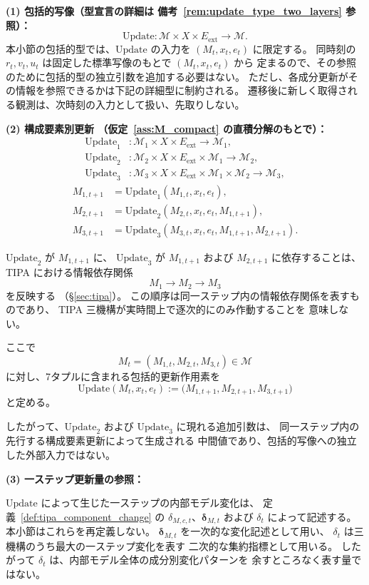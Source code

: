 \begin{definition}[Update作用素の構造]
\label{def:update_operator}

\textbf{(1) 包括的写像（型宣言の詳細は
備考~\ref{rem:update_type_two_layers} 参照）：}
\[
  \mathrm{Update} :
  \mathcal{M}\times X\times E_{\mathrm{ext}}
  \longrightarrow
  \mathcal{M}.
\]
本小節の包括的型では、$\mathrm{Update}$ の入力を
$(M_t,x_t,e_t)$ に限定する。
同時刻の $r_t,v_t,u_t$ は固定した標準写像のもとで $(M_t,x_t,e_t)$ から
定まるので、その参照のために包括的型の独立引数を追加する必要はない。
ただし、各成分更新がその情報を参照できるかは下記の詳細型に制約される。
遷移後に新しく取得される観測は、次時刻の入力として扱い、先取りしない。

\medskip
\noindent\textbf{(2) 構成要素別更新
（仮定~\ref{ass:M_compact} の直積分解のもとで）：}
\[
\begin{aligned}
  \mathrm{Update}_1
  &: \mathcal{M}_1\times X\times E_{\mathrm{ext}}
  \to\mathcal{M}_1,\\
  \mathrm{Update}_2
  &: \mathcal{M}_2\times X\times E_{\mathrm{ext}}
  \times\mathcal{M}_1
  \to\mathcal{M}_2,\\
  \mathrm{Update}_3
  &: \mathcal{M}_3\times X\times E_{\mathrm{ext}}
  \times\mathcal{M}_1\times\mathcal{M}_2
  \to\mathcal{M}_3,
\end{aligned}
\]
\[
\begin{aligned}
  M_{1,t+1}
  &=
  \mathrm{Update}_1(M_{1,t},x_t,e_t),\\
  M_{2,t+1}
  &=
  \mathrm{Update}_2(
    M_{2,t},x_t,e_t,M_{1,t+1}
  ),\\
  M_{3,t+1}
  &=
  \mathrm{Update}_3(
    M_{3,t},x_t,e_t,
    M_{1,t+1},M_{2,t+1}
  ).
\end{aligned}
\]

$\mathrm{Update}_2$ が $M_{1,t+1}$ に、
$\mathrm{Update}_3$ が $M_{1,t+1}$ および
$M_{2,t+1}$ に依存することは、
TIPA における情報依存関係
\[
  M_1\to M_2\to M_3
\]
を反映する
（\S\ref{sec:tipa}）。
この順序は同一ステップ内の情報依存関係を表すものであり、
TIPA 三機構が実時間上で逐次的にのみ作動することを
意味しない。

ここで
\[
  M_t
  =
  (M_{1,t},M_{2,t},M_{3,t})
  \in\mathcal{M}
\]
に対し、7タプルに含まれる包括的更新作用素を
\[
  \mathrm{Update}(M_t,x_t,e_t)
  :=
  \bigl(
    M_{1,t+1},
    M_{2,t+1},
    M_{3,t+1}
  \bigr)
\]
と定める。

したがって、$\mathrm{Update}_2$ および
$\mathrm{Update}_3$ に現れる追加引数は、
同一ステップ内の先行する構成要素更新によって生成される
中間値であり、包括的写像への独立した外部入力ではない。

\medskip
\noindent\textbf{(3) 一ステップ更新量の参照：}

$\mathrm{Update}$ によって生じた一ステップの内部モデル変化は、
定義~\ref{def:tipa_component_change} の
$\delta_{M,c,t}$、$\boldsymbol{\delta}_{M,t}$ および
$\delta_t$ によって記述する。
本小節はこれらを再定義しない。
$\boldsymbol{\delta}_{M,t}$ を一次的な変化記述として用い、
$\delta_t$ は三機構のうち最大の一ステップ変化を表す
二次的な集約指標として用いる。
したがって $\delta_t$ は、内部モデル全体の成分別変化パターンを
余すところなく表す量ではない。
\end{definition}

